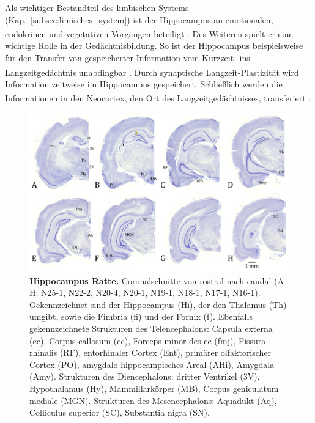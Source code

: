 \documentclass[12pt,a4paper,pdftex]{article}
\begin{document}
\noindent Als wichtiger Bestandteil des limbischen Systems (Kap.~\ref{subsec:limisches_system}) ist der Hippocampus an emotionalen, endokrinen und vegetativen Vorgängen beteiligt \textsuperscript{\cite[9]{trepel2011neuroanatomie}}. Des Weiteren spielt er eine wichtige Rolle in der Gedächtnisbildung. So ist der Hippocampus beispielsweise für den Transfer von gespeicherter Information vom Kurzzeit- ins Langzeitgedächtnis unabdingbar \textsuperscript{\cite[6]{storch2012lehrbuchzoo}}. Durch synaptische Langzeit-Plastizität wird Information zeitweise im Hippocampus gespeichert. Schließlich werden die Informationen in den Neocortex, den Ort des Langzeitgedächtnisses, transferiert \textsuperscript{\cite[18]{kandel2013principles}}.

\begin{figure}[H]
    \centering
    \includegraphics[width=\textwidth]{pictures/Bilder_Jule/Ratte/hippocampus.png}
    \caption[Hippocampus Ratte]{\textbf{Hippocampus Ratte.} Coronalschnitte von rostral nach caudal (A-H: N25-1, N22-2, N20-4, N20-1, N19-1, N18-1, N17-1, N16-1). Gekennzeichnet sind der Hippocampus (Hi), der den Thalamus (Th) umgibt, sowie die Fimbria (fi) und der Fornix (f). Ebenfalls gekennzeichnete Strukturen des Telencephalons: Capsula externa (ec), Corpus callosum (cc), Forceps minor des cc (fmj), Fissura rhinalis (RF), entorhinaler Cortex  (Ent), primärer olfaktorischer Cortex (PO), amygdalo-hippocampisches Areal (AHi), Amygdala (Amy). Strukturen des Diencephalons: dritter Ventrikel (3V), Hypothalamus (Hy), Mammillarkörper (MB), Corpus geniculatum mediale (MGN). Strukturen des Mesencephalons: Aquädukt (Aq), Colliculus superior (SC), Substantia nigra (SN).}
    \label{fig:hippocampus_ratte}
\end{figure}{}
\end{document}
